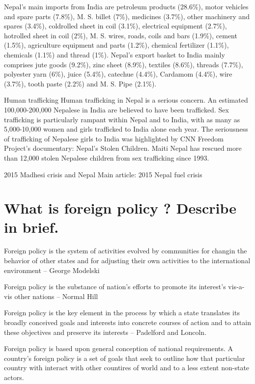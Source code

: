 \documentclass[
  openany]{book}
\begin{document}
Nepal's main imports from India are petroleum products (28.6\%), motor vehicles and spare parts (7.8\%), M. S. billet (7\%), medicines (3.7\%), other machinery and spares (3.4\%), coldrolled sheet in coil (3.1\%), electrical equipment (2.7\%), hotrolled sheet in coil (2\%), M. S. wires, roads, coils and bars (1.9\%), cement (1.5\%), agriculture equipment and parts (1.2\%), chemical fertilizer (1.1\%), chemicals (1.1\%) and thread (1\%). Nepal's export basket to India mainly comprises jute goods (9.2\%), zinc sheet (8.9\%), textiles (8.6\%), threads (7.7\%), polyester yarn (6\%), juice (5.4\%), catechue (4.4\%), Cardamom (4.4\%), wire (3.7\%), tooth paste (2.2\%) and M. S. Pipe (2.1\%).

Human trafficking
Human trafficking in Nepal is a serious concern. An estimated 100,000-200,000 Nepalese in India are believed to have been trafficked. Sex trafficking is particularly rampant within Nepal and to India, with as many as 5,000-10,000 women and girls trafficked to India alone each year. The seriousness of trafficking of Nepalese girls to India was highlighted by CNN Freedom Project's documentary: Nepal's Stolen Children. Maiti Nepal has rescued more than 12,000 stolen Nepalese children from sex trafficking since 1993.

2015 Madhesi crisis and Nepal
Main article: 2015 Nepal fuel crisis

\hypertarget{what-is-foreign-policy-describe-in-brief.}{%
\section{What is foreign policy ? Describe in brief.}\label{what-is-foreign-policy-describe-in-brief.}}

Foreign policy is the system of activities evolved by communities for changin the behavior of other states and for adjusting their own activities to the international environment -- George Modelski

Foreign policy is the substance of nation's efforts to promote its interest's vis-a-vis other nations -- Normal Hill

Foreign policy is the key element in the process by which a state translates its broadly conceived goals and interests into concrete courses of action and to attain these objectives and preserve its interests -- Padelford and Loncoln.

Foreign policy is based upon general conception of national requirements. A country's foreign policy is a set of goals that seek to outline how that particular country with interact with other countires of world and to a less extent non-state actors.
\end{document}
